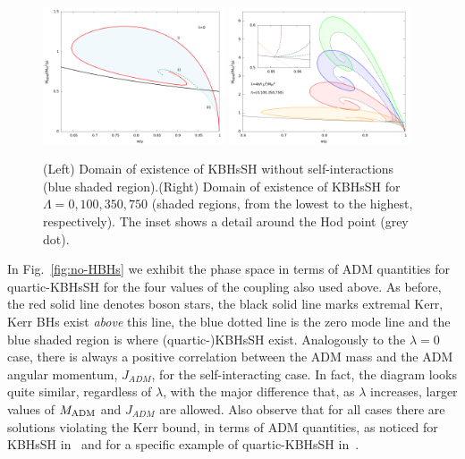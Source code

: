 \begin{figure}[h!]
  \begin{center}
    \includegraphics[width=0.48\textwidth]{papers/selfInteractions/w-vs-M-0.png}
    \includegraphics[width=0.48\textwidth]{papers/selfInteractions/BH-w-Mtimes4.png}
      \end{center}
  \caption{(Left) Domain of existence of KBHsSH without self-interactions (blue shaded region).(Right) Domain of existence of KBHsSH for $\Lambda=0,100,350,750$ (shaded regions, from the lowest to the highest, respectively). The inset shows a detail around the Hod point (grey dot).}
  \label{kbhsh1}
\end{figure}


In Fig.~\ref{fig:no-HBHs} we exhibit the phase space in terms of ADM quantities for quartic-KBHsSH for the four values of the coupling also used above. As before, the red solid line denotes boson stars, the black solid line marks extremal Kerr, Kerr BHs exist \textit{above} this line, the blue dotted line is the zero mode line and the blue shaded region is where (quartic-)KBHsSH exist. Analogously to the $\lambda=0$ case, there is always a positive correlation between the ADM mass and the ADM angular momentum, $J_{ADM}$, for the self-interacting case. In fact, the diagram looks quite similar, regardless of $\lambda$, with the major difference that, as $\lambda$ increases, larger values of $M_{\rm ADM}$ and $J_{ADM}$ are allowed. Also observe that for all cases there are solutions violating the Kerr bound, in terms of ADM quantities, as noticed for KBHsSH in~\cite{Herdeiro:2014goa,Herdeiro:2015moa} and for a specific example of quartic-KBHsSH in~\cite{Kleihaus:2015iea}.



